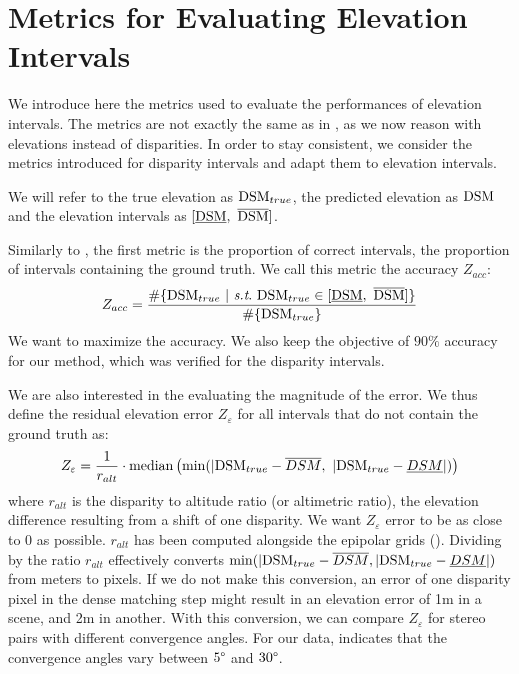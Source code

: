 \section{Metrics for Evaluating Elevation Intervals}\label{sec:metrics_elevation}
We introduce here the metrics used to evaluate the performances of elevation intervals. The metrics are not exactly the same as in , as we now reason with elevations instead of disparities. In order to stay consistent, we consider the metrics introduced for disparity intervals and adapt them to elevation intervals. 

We will refer to the true elevation as $\mathrm{DSM}_{true}$, the predicted elevation as $\mathrm{DSM}$ and the elevation intervals as $[\underline{\mathrm{DSM}},~\overline{\mathrm{DSM}}]$.

Similarly to , the first metric is the proportion of correct intervals, \ie the proportion of intervals containing the ground truth. We call this metric the accuracy $Z_{acc}$:
\begin{align}\label{eq:relative_accuracy_elevation}
    Z_{acc} = \dfrac{\#\{\DSM_{true} ~|~ \st ~\DSM_{true}\in [\underline{\DSM},~\overline{\DSM}]\}}{\#\{\DSM_{true}\}}
\end{align}
We want to maximize the accuracy. We also keep the objective of $90\%$ accuracy for our method, which was verified for the disparity intervals.

We are also interested in the evaluating the magnitude of the error. We thus define the residual elevation error $Z_{\varepsilon}$ for all intervals that do not contain the ground truth as:
\begin{align}
    Z_\varepsilon=\dfrac{1}{r_{alt}} \cdot\operatorname*{median} \left( \min(|\mathrm{DSM}_{true}-\overline{DSM}, ~ |\mathrm{DSM}_{true}-\underline{DSM}|)\right)\label{eq:residual_error_elevation}
\end{align}
where $r_{alt}$ is the disparity to altitude ratio (or altimetric ratio), \ie the elevation difference resulting from a shift of one disparity. We want $Z_\varepsilon$ error to be as close to 0 as possible. $r_{alt}$ has been computed alongside the epipolar grids (). Dividing by the ratio $r_{alt}$ effectively converts $\min(|\mathrm{DSM}_{true}-\overline{DSM}, |\mathrm{DSM}_{true}-\underline{DSM}|)$ from meters to pixels. If we do not make this conversion, an error of one disparity pixel in the dense matching step might result in an elevation error of 1m in a scene, and 2m in another. With this conversion, we can compare $Z_\varepsilon$ for stereo pairs with different convergence angles. For our data,  indicates that the convergence angles vary between $5\degree$ and $30\degree$. 


